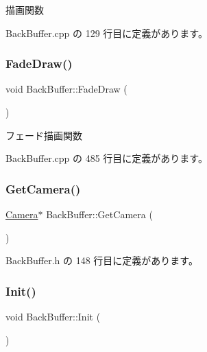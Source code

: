描画関数 



 Back\+Buffer.\+cpp の 129 行目に定義があります。

\mbox{\label{class_back_buffer_a9835a5db9850f774a382c4f8e611b1d1}} 
\subsubsection{\texorpdfstring{Fade\+Draw()}{FadeDraw()}}
{\footnotesize\ttfamily void Back\+Buffer\+::\+Fade\+Draw (\begin{DoxyParamCaption}{ }\end{DoxyParamCaption})\hspace{0.3cm}{\ttfamily [private]}}



フェード描画関数 



 Back\+Buffer.\+cpp の 485 行目に定義があります。

\mbox{\label{class_back_buffer_addd0da33667c19cfba7f1d81009486f2}} 
\subsubsection{\texorpdfstring{Get\+Camera()}{GetCamera()}}
{\footnotesize\ttfamily \mbox{\hyperlink{class_camera}{Camera}}$\ast$ Back\+Buffer\+::\+Get\+Camera (\begin{DoxyParamCaption}{ }\end{DoxyParamCaption})\hspace{0.3cm}{\ttfamily [inline]}}



 Back\+Buffer.\+h の 148 行目に定義があります。

\mbox{\label{class_back_buffer_a65ac0a652db2a558ecda120ef3f47a10}} 
\subsubsection{\texorpdfstring{Init()}{Init()}}
{\footnotesize\ttfamily void Back\+Buffer\+::\+Init (\begin{DoxyParamCaption}{ }\end{DoxyParamCaption})}



